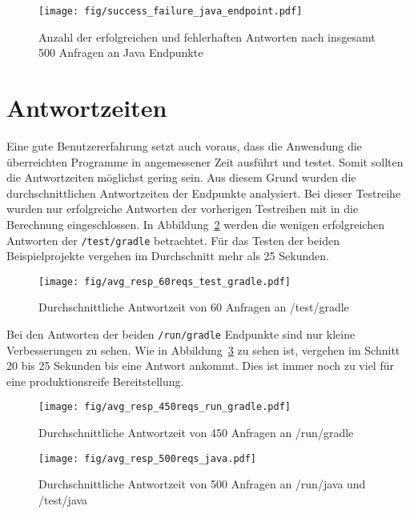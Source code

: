 \begin{figure}
  \centering
  \texttt{[image: fig/success\_failure\_java\_endpoint.pdf]}
  \caption{Anzahl der erfolgreichen und fehlerhaften Antworten nach insgesamt 500 Anfragen an Java Endpunkte}
  \label{fig:success_failure_java_endpoint}
\end{figure}

\section{Antwortzeiten}
Eine gute Benutzererfahrung setzt auch voraus, dass die Anwendung die überreichten Programme in
angemessener Zeit ausführt und testet. Somit sollten die Antwortzeiten möglichst gering sein.
Aus diesem Grund wurden die durchschnittlichen Antwortzeiten der Endpunkte analysiert.
Bei dieser Testreihe wurden nur erfolgreiche Antworten der vorherigen Testreihen mit in die
Berechnung eingeschlossen.
In Abbildung~\ref{fig:avg_resp_60reqs_test_gradle} werden die wenigen erfolgreichen Antworten
der \texttt{/test/gradle} betrachtet. Für das Testen der beiden Beispielprojekte vergehen
im Durchschnitt mehr als 25 Sekunden.

\begin{figure}
  \centering
  \texttt{[image: fig/avg\_resp\_60reqs\_test\_gradle.pdf]}
  \caption{Durchschnittliche Antwortzeit von 60 Anfragen an /test/gradle}
  \label{fig:avg_resp_60reqs_test_gradle}
\end{figure}

Bei den Antworten der beiden \texttt{/run/gradle} Endpunkte sind nur kleine Verbesserungen zu sehen.
Wie in Abbildung~\ref{fig:avg_resp_450reqs_run_gradle} zu sehen ist, vergehen im Schnitt
20 bis 25 Sekunden bis eine Antwort ankommt. Dies ist immer noch zu viel für eine produktionsreife
Bereitstellung.

\begin{figure}
  \centering
  \texttt{[image: fig/avg\_resp\_450reqs\_run\_gradle.pdf]}
  \caption{Durchschnittliche Antwortzeit von 450 Anfragen an /run/gradle}
  \label{fig:avg_resp_450reqs_run_gradle}
\end{figure}

\begin{figure}
  \centering
  \texttt{[image: fig/avg\_resp\_500reqs\_java.pdf]}
  \caption{Durchschnittliche Antwortzeit von 500 Anfragen an /run/java und /test/java}
  \label{fig:avg_resp_500reqs_java}
\end{figure}

